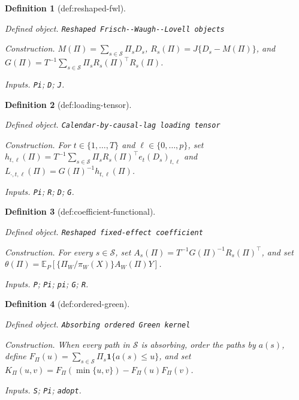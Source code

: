 \documentclass{article}
\newtheorem{definition}{Definition}
\begin{document}
\begin{definition}[def:reshaped-fwl]\label{def:reshaped-fwl}
\par\smallskip\noindent\emph{Defined object.} \texttt{Reshaped Frisch-\allowbreak{}-\allowbreak{}Waugh-\allowbreak{}-\allowbreak{}Lovell objects}
\par\smallskip\noindent\emph{Construction.} \(M(\Pi)=\sum_{s\in\mathcal S}\Pi_sD_s\), \(R_s(\Pi)=J\{D_s-M(\Pi)\}\), and \(G(\Pi)=T^{-1}\sum_{s\in\mathcal S}\Pi_sR_s(\Pi)^{\top}R_s(\Pi)\).
\par\smallskip\noindent\emph{Inputs.} \texttt{Pi}; \texttt{D}; \texttt{J}.
\end{definition}

\begin{definition}[def:loading-tensor]\label{def:loading-tensor}
\par\smallskip\noindent\emph{Defined object.} \texttt{Calendar-\allowbreak{}by-\allowbreak{}causal-\allowbreak{}lag loading tensor}
\par\smallskip\noindent\emph{Construction.} For \(t\in\{1,\ldots,T\}\) and \(\ell\in\{0,\ldots,p\}\), set \(h_{t,\ell}(\Pi)=T^{-1}\sum_{s\in\mathcal S}\Pi_sR_s(\Pi)^{\top}e_t(D_s)_{t,\ell}\) and \(L_{\cdot,t,\ell}(\Pi)=G(\Pi)^{-1}h_{t,\ell}(\Pi)\).
\par\smallskip\noindent\emph{Inputs.} \texttt{Pi}; \texttt{R}; \texttt{D}; \texttt{G}.
\end{definition}

\begin{definition}[def:coefficient-functional]\label{def:coefficient-functional}
\par\smallskip\noindent\emph{Defined object.} \texttt{Reshaped fixed-\allowbreak{}effect coefficient}
\par\smallskip\noindent\emph{Construction.} For every \(s\in\mathcal S\), set \(A_s(\Pi)=T^{-1}G(\Pi)^{-1}R_s(\Pi)^{\top}\), and set \(\theta(\Pi)=\mathbb E_P[\{\Pi_W/\pi_W(X)\}A_W(\Pi)Y]\).
\par\smallskip\noindent\emph{Inputs.} \texttt{P}; \texttt{Pi}; \texttt{pi}; \texttt{G}; \texttt{R}.
\end{definition}

\begin{definition}[def:ordered-green]\label{def:ordered-green}
\par\smallskip\noindent\emph{Defined object.} \texttt{Absorbing ordered Green kernel}
\par\smallskip\noindent\emph{Construction.} When every path in \(\mathcal S\) is absorbing, order the paths by \(a(s)\), define \(F_{\Pi}(u)=\sum_{s\in\mathcal S}\Pi_s\mathbf 1\{a(s)\leq u\}\), and set \(K_{\Pi}(u,v)=F_{\Pi}(\min\{u,v\})-F_{\Pi}(u)F_{\Pi}(v)\).
\par\smallskip\noindent\emph{Inputs.} \texttt{S}; \texttt{Pi}; \texttt{adopt}.
\end{definition}
\end{document}
